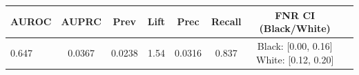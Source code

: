 \begin{tabular}{lccccccc}
\toprule
AUROC & AUPRC & Prev & Lift & Prec & Recall & FNR CI (Black/White) \\
\midrule
0.647 & 0.0367 & 0.0238 & 1.54 & 0.0316 & 0.837 & Black: [0.00, 0.16] White: [0.12, 0.20] \\
\bottomrule
\end{tabular}